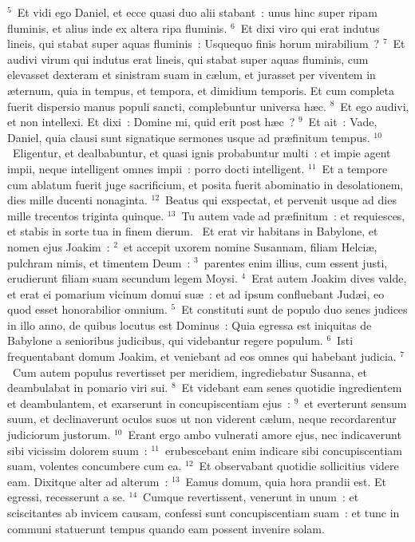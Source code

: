${}^{5}$~Et vidi ego Daniel, et ecce quasi duo alii stabant~: unus hinc super ripam fluminis, et alius inde ex altera ripa fluminis.
${}^{6}$~Et dixi viro qui erat indutus lineis, qui stabat super aquas fluminis~: Usquequo finis horum mirabilium~?
${}^{7}$~Et audivi virum qui indutus erat lineis, qui stabat super aquas fluminis, cum elevasset dexteram et sinistram suam in c\ae lum, et jurasset per viventem in \ae ternum, quia in tempus, et tempora, et dimidium temporis. Et cum completa fuerit dispersio manus populi sancti, complebuntur universa h\ae c.
${}^{8}$~Et ego audivi, et non intellexi. Et dixi~: Domine mi, quid erit post h\ae c~?
${}^{9}$~Et ait~: Vade, Daniel, quia clausi sunt signatique sermones usque ad pr\ae finitum tempus.
${}^{10}$~Eligentur, et dealbabuntur, et quasi ignis probabuntur multi~: et impie agent impii, neque intelligent omnes impii~: porro docti intelligent.
${}^{11}$~Et a tempore cum ablatum fuerit juge sacrificium, et posita fuerit abominatio in desolationem, dies mille ducenti nonaginta.
${}^{12}$~Beatus qui exspectat, et pervenit usque ad dies mille trecentos triginta quinque.
${}^{13}$~Tu autem vade ad pr\ae finitum~: et requiesces, et stabis in sorte tua in finem dierum.
~Et erat vir habitans in Babylone, et nomen ejus Joakim~:
${}^{2}$~et accepit uxorem nomine Susannam, filiam Helci\ae , pulchram nimis, et timentem Deum~:
${}^{3}$~parentes enim illius, cum essent justi, erudierunt filiam suam secundum legem Moysi.
${}^{4}$~Erat autem Joakim dives valde, et erat ei pomarium vicinum domui su\ae~: et ad ipsum confluebant Jud\ae i, eo quod esset honorabilior omnium.
${}^{5}$~Et constituti sunt de populo duo senes judices in illo anno, de quibus locutus est Dominus~: Quia egressa est iniquitas de Babylone a senioribus judicibus, qui videbantur regere populum.
${}^{6}$~Isti frequentabant domum Joakim, et veniebant ad eos omnes qui habebant judicia.
${}^{7}$~Cum autem populus revertisset per meridiem, ingrediebatur Susanna, et deambulabat in pomario viri sui.
${}^{8}$~Et videbant eam senes quotidie ingredientem et deambulantem, et exarserunt in concupiscentiam ejus~:
${}^{9}$~et everterunt sensum suum, et declinaverunt oculos suos ut non viderent c\ae lum, neque recordarentur judiciorum justorum.
${}^{10}$~Erant ergo ambo vulnerati amore ejus, nec indicaverunt sibi vicissim dolorem suum~:
${}^{11}$~erubescebant enim indicare sibi concupiscentiam suam, volentes concumbere cum ea.
${}^{12}$~Et observabant quotidie sollicitius videre eam. Dixitque alter ad alterum~:
${}^{13}$~Eamus domum, quia hora prandii est. Et egressi, recesserunt a se.
${}^{14}$~Cumque revertissent, venerunt in unum~: et sciscitantes ab invicem causam, confessi sunt concupiscentiam suam~: et tunc in communi statuerunt tempus quando eam possent invenire solam.


